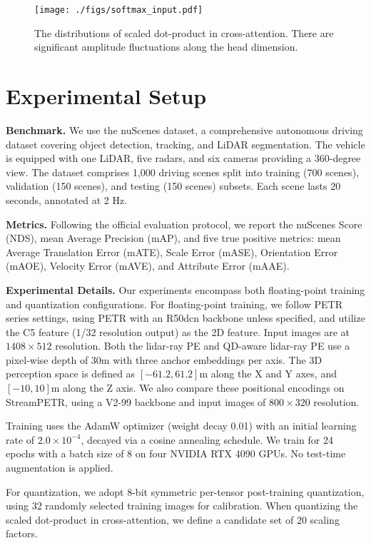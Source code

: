\begin{figure}[htb]
\centering
	\texttt{[image: ./figs/softmax\_input.pdf]}
	\caption{The distributions of scaled dot-product in cross-attention. There are significant amplitude fluctuations along the head dimension.}
	\label{fig:scaled_dot_product}
\end{figure}


\fi

\section{Experimental Setup}\label{sec:exp_setup}
\textbf{Benchmark.}
We use the nuScenes dataset, a comprehensive autonomous driving dataset covering object detection, tracking, and LiDAR segmentation. The vehicle is equipped with one LiDAR, five radars, and six cameras providing a 360-degree view. The dataset comprises 1,000 driving scenes split into training (700 scenes), validation (150 scenes), and testing (150 scenes) subsets. Each scene lasts 20 seconds, annotated at 2 Hz.

\textbf{Metrics.}
Following the official evaluation protocol, we report the nuScenes Score (NDS), mean Average Precision (mAP), and five true positive metrics: mean Average Translation Error (mATE), Scale Error (mASE), Orientation Error (mAOE), Velocity Error (mAVE), and Attribute Error (mAAE).


\textbf{Experimental Details.}
Our experiments encompass both floating-point training and quantization configurations. For floating-point training, we follow PETR series settings, using PETR with an R50dcn backbone unless specified, and utilize the C5 feature (1/32 resolution output) as the 2D feature. Input images are at $1408 \times 512$ resolution. Both the lidar-ray PE and QD-aware lidar-ray PE use a pixel-wise depth of 30m with three anchor embeddings per axis. The 3D perception space is defined as $[-61.2, 61.2]$m along the X and Y axes, and $[-10, 10]$m along the Z axis. We also compare these positional encodings on StreamPETR, using a V2-99 backbone and input images of $800 \times 320$ resolution.

Training uses the AdamW optimizer (weight decay 0.01) with an initial learning rate of $2.0 \times 10^{-4}$, decayed via a cosine annealing schedule. We train for 24 epochs with a batch size of 8 on four NVIDIA RTX 4090 GPUs. No test-time augmentation is applied.

For quantization, we adopt 8-bit symmetric per-tensor post-training quantization, using 32 randomly selected training images for calibration. When quantizing the scaled dot-product in cross-attention, we define a candidate set of 20 scaling factors.


